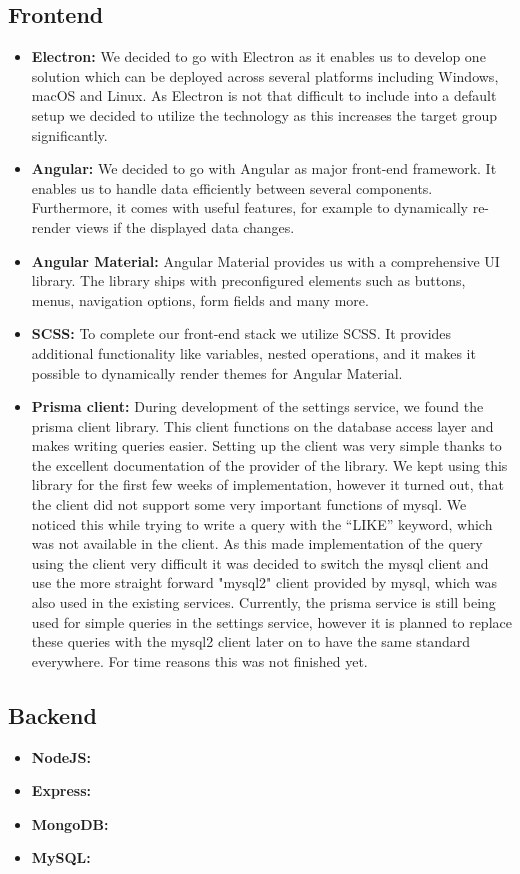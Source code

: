 \subsection{Frontend}\label{subsec:frontend}

\begin{itemize}
    \item \textbf{Electron:} We decided to go with Electron as it enables us to develop one solution which can be
        deployed across several platforms including Windows, macOS and Linux.
        As Electron is not that difficult to include into a default setup we decided to utilize the technology as this
        increases the target group significantly.
    \item \textbf{Angular:} We decided to go with Angular as major front-end framework.
        It enables us to handle data efficiently between several components.
        Furthermore, it comes with useful features, for example to dynamically re-render views if the displayed data changes.
    \item \textbf{Angular Material:} Angular Material provides us with a comprehensive UI library.
        The library ships with preconfigured elements such as buttons, menus, navigation options, form fields and many
        more.
    \item \textbf{SCSS:} To complete our front-end stack we utilize SCSS. It provides additional functionality like
        variables, nested operations, and it makes it possible to dynamically render themes for Angular Material.
    \item \textbf{Prisma client:} During development of the settings service, we found the prisma client library.
        This client functions on the database access layer and makes writing queries easier.
        Setting up the client was very simple thanks to the excellent documentation of the provider of the library.
        We kept using this library for the first few weeks of implementation, however it turned out, that the client
        did not support some very important functions of mysql.
        We noticed this while trying to write a query with the \enquote{LIKE}  keyword, which was not available in the
        client.
        As this made implementation of the query using the client very difficult it was decided to switch the mysql
        client and use the more straight forward "mysql2" client provided by mysql, which was also used in the existing
        services.
        Currently, the prisma service is still being used for simple queries in the settings service, however it is
        planned to replace these queries with the mysql2 client later on to have the same standard everywhere.
        For time reasons this was not finished yet.
\end{itemize}

\subsection{Backend}\label{subsec:backend}

\begin{itemize}
    \item \textbf{NodeJS:} %
    \item \textbf{Express:} %
    \item \textbf{MongoDB:} %
    \item \textbf{MySQL:} %
\end{itemize}
